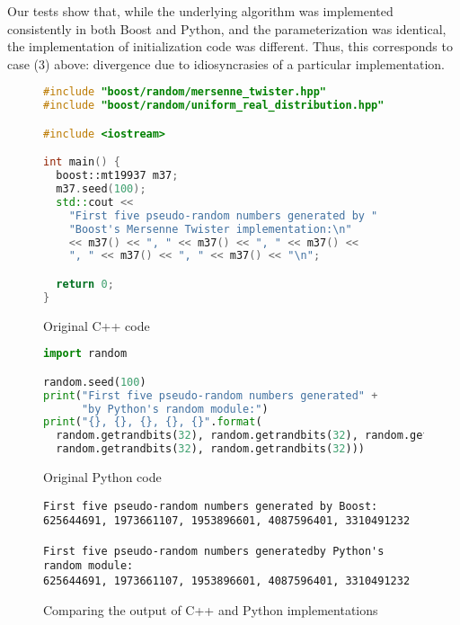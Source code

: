 \documentclass{article}
\begin{document}
Our tests show that, while the underlying algorithm was implemented consistently in both Boost and Python, and the parameterization was identical, the implementation of initialization code was different. Thus, this corresponds to case (3) above: divergence due to idiosyncrasies of a particular implementation.

\begin{figure}
\begin{lstlisting}[language=C++]
#include "boost/random/mersenne_twister.hpp"
#include "boost/random/uniform_real_distribution.hpp"

#include <iostream>

int main() {
  boost::mt19937 m37;
  m37.seed(100);
  std::cout <<
    "First five pseudo-random numbers generated by "
    "Boost's Mersenne Twister implementation:\n"
    << m37() << ", " << m37() << ", " << m37() <<
    ", " << m37() << ", " << m37() << "\n";

  return 0;
}
\end{lstlisting}
\caption{Original C++ code}
\label{fig:01}
\end{figure}

\begin{figure}
\begin{lstlisting}[language=Python]
import random

random.seed(100)
print("First five pseudo-random numbers generated" +
      "by Python's random module:")
print("{}, {}, {}, {}, {}".format(
  random.getrandbits(32), random.getrandbits(32), random.getrandbits(32),
  random.getrandbits(32), random.getrandbits(32)))
\end{lstlisting}
\caption{Original Python code}
\label{fig:02}
\end{figure}

\begin{figure}
\begin{lstlisting}
First five pseudo-random numbers generated by Boost:
625644691, 1973661107, 1953896601, 4087596401, 3310491232

First five pseudo-random numbers generatedby Python's random module:
625644691, 1973661107, 1953896601, 4087596401, 3310491232
\end{lstlisting}
\caption{Comparing the output of C++ and Python implementations}
\label{fig:03}
\end{figure}



\end{document}
